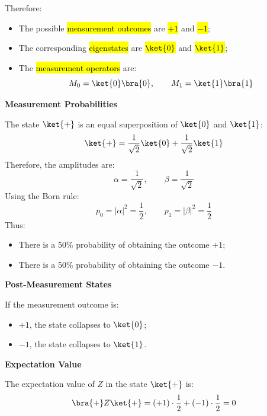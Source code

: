 Therefore:
\begin{itemize}
    \item The possible \hl{measurement outcomes} are \hl{$+1$} and \hl{$-1$};
    \item The corresponding \hl{eigenstates} are \hl{$\ket{0}$} and \hl{$\ket{1}$};
    \item The \hl{measurement operators} are:
    \begin{equation*}
        M_0 = \ket{0}\bra{0},
        \qquad
        M_1 = \ket{1}\bra{1}
    \end{equation*}
\end{itemize}

\begin{flushleft}
    \textcolor{Green3}{ \textbf{Measurement Probabilities}}
\end{flushleft}
The state $\ket{+}$ is an equal superposition of $\ket{0}$ and $\ket{1}$:
\begin{equation*}
    \ket{+}
    =
    \frac{1}{\sqrt{2}}\ket{0}
    +
    \frac{1}{\sqrt{2}}\ket{1}
\end{equation*}
Therefore, the amplitudes are:
\begin{equation*}
    \alpha = \frac{1}{\sqrt{2}},
    \qquad
    \beta = \frac{1}{\sqrt{2}}
\end{equation*}
Using the Born rule:
\begin{equation*}
    p_0 = |\alpha|^2 = \frac{1}{2},
    \qquad
    p_1 = |\beta|^2 = \frac{1}{2}
\end{equation*}
Thus:
\begin{itemize}
    \item There is a 50\% probability of obtaining the outcome $+1$;
    \item There is a 50\% probability of obtaining the outcome $-1$.
\end{itemize}

\begin{flushleft}
    \textcolor{Green3}{ \textbf{Post-Measurement States}}
\end{flushleft}
If the measurement outcome is:
\begin{itemize}
    \item $+1$, the state collapses to $\ket{0}$;
    \item $-1$, the state collapses to $\ket{1}$.
\end{itemize}

\highspace
\begin{flushleft}
    \textcolor{Green3}{ \textbf{Expectation Value}}
\end{flushleft}
The expectation value of $Z$ in the state $\ket{+}$ is:
\begin{equation*}
    \bra{+} Z \ket{+}
    =
    (+1)\cdot \frac{1}{2}
    +
    (-1)\cdot \frac{1}{2}
    =
    0
\end{equation*}

